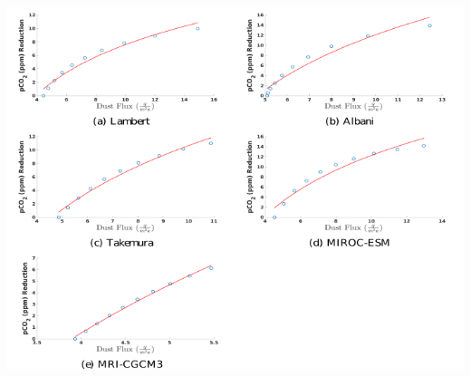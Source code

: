 \documentclass[landscape,a0paper,fontscale=0.33]{baposter} %
\begin{document}
\begin{poster}
{\begin{multicols}{2}
\setlength{\fboxrule}{2pt}
\begin{center}
\includegraphics[width=1\linewidth]{R_All.png}
\end{center}

\setlength{\fboxrule}{2pt}
\begin{center}
\end{center}

\end{multicols}
\begin{multicols}{3}


\end{multicols}}
\end{poster}
\end{document}
